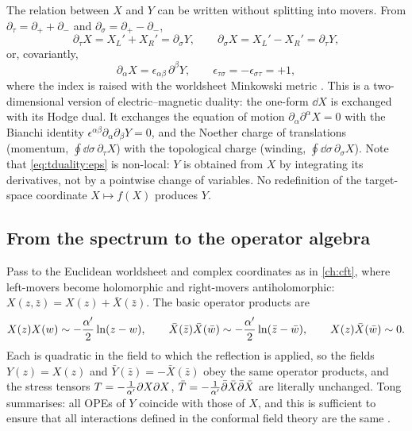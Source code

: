 The relation between $X$ and $Y$ can be written without splitting into movers. From
$\partial_\tau=\partial_++\partial_-$ and $\partial_\sigma=\partial_+-\partial_-$,
\[
 \partial_\tau X=X_L'+X_R'=\partial_\sigma Y,\qquad
 \partial_\sigma X=X_L'-X_R'=\partial_\tau Y,
\]
or, covariantly,
\begin{equation}\label{eq:tduality:eps}
  \partial_\alpha X=\epsilon_{\alpha\beta}\,\partial^\beta Y,\qquad
  \epsilon_{\tau\sigma}=-\epsilon_{\sigma\tau}=+1,
\end{equation}
where the index is raised with the worldsheet Minkowski metric . This is a two-dimensional version of electric--magnetic duality: the
one-form $\dd X$ is exchanged with its Hodge dual. It exchanges the equation of motion
$\partial_\alpha\partial^\alpha X=0$ with the Bianchi identity
$\epsilon^{\alpha\beta}\partial_\alpha\partial_\beta Y=0$, and the Noether charge of translations
(momentum, $\oint\dd\sigma\,\partial_\tau X$) with the topological charge (winding,
$\oint\dd\sigma\,\partial_\sigma X$). Note that \eqref{eq:tduality:eps} is non-local: $Y$ is
obtained from $X$ by integrating its derivatives, not by a pointwise change of variables. No
redefinition of the target-space coordinate $X\mapsto f(X)$ produces $Y$.

\subsection{From the spectrum to the operator algebra}

Pass to the Euclidean worldsheet and complex coordinates as in \cref{ch:cft}, where
left-movers become holomorphic and right-movers antiholomorphic: $X(z,\bar z)=X(z)+\bar X(\bar z)$.
The basic operator products are
\begin{equation}\label{eq:tduality:ope}
  X(z)X(w)\sim-\frac{\alpha'}2\ln(z-w),\qquad
  \bar X(\bar z)\bar X(\bar w)\sim-\frac{\alpha'}2\ln(\bar z-\bar w),\qquad
  X(z)\bar X(\bar w)\sim0 .
\end{equation}
Each is quadratic in the field to which the reflection is applied, so the fields
$Y(z)=X(z)$ and $\bar Y(\bar z)=-\bar X(\bar z)$ obey the same operator products, and the stress
tensors $T=-\frac1{\alpha'}\partial X\partial X$, $\bar T=-\frac1{\alpha'}\bar\partial\bar X\bar\partial\bar X$
are literally unchanged. Tong summarises: all OPEs of $Y$ coincide with those of $X$, and
this is sufficient to ensure that all interactions defined in the conformal field theory are
the same .

